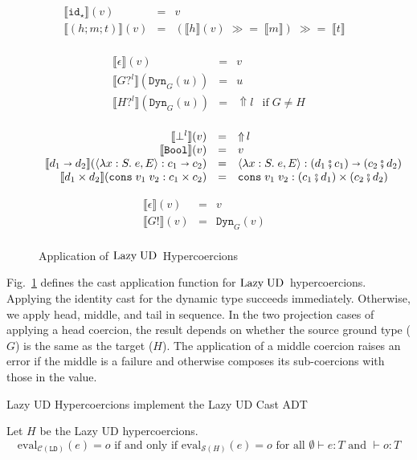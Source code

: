 \documentclass[runningheads]{llncs}
\newcommand{\sidecond}[1]{\text{if}\;#1}
\newcommand{\figequalto}[3]{#1 & = & #2 & #3 \\}
\newcommand{\LUD}{\ensuremath{\text{Lazy\;UD}}}
\newcommand{\CMachine}[1]{\ensuremath{\mathcal{C}(#1)}}
\newcommand{\LDMachine}{\CMachine{\BLD}}
\newcommand{\SMachine}[1]{\ensuremath{\mathcal{S}(#1)}}
\newcommand{\error}[1]{\ensuremath{\mathop{\Uparrow}#1}}
\newcommand{\Tdyn}[0]{\ensuremath{\star}}
\newcommand{\Pbool}[0]{\ensuremath{\mathtt{Bool}}}
\newcommand{\Pfunc}[2]{\ensuremath{#1 \shortrightarrow #2}}
\newcommand{\Pprod}[2]{\ensuremath{#1 \times #2}}
\newcommand{\elam}[3]{\lambda#1:#2.\;#3}
\newcommand{\econs}[2]{\mathtt{cons} \; #1 \; #2}
\newcommand{\ecast}[2]{\ensuremath{#1 : #2}}
\newcommand{\vdyn}[2]{\mathtt{Dyn}_{#1}(#2)}
\newcommand{\vfunc}[4]{\langle\elam{#1}{#2}{#3},#4\rangle}
\newcommand{\vcons}[2]{\econs{#1}{#2}}
\newcommand{\BLD}[0]{\ensuremath{\mathtt{LD}}}
\newcommand{\cnfid}[1]{\ensuremath{\mathtt{id}_{#1}}}
\newcommand{\hcci}[0]{\cnfid{\Tdyn}}
\newcommand{\hccc}[3]{\ensuremath{(#1;#2;#3)}}
\newcommand{\hche}[0]{\ensuremath{\epsilon}}
\newcommand{\hchp}[2]{\ensuremath{#1?^{#2}}}
\newcommand{\hcmbool}[0]{\Pbool}
\newcommand{\hcmfunc}[2]{\Pfunc{#1}{#2}}
\newcommand{\hcmprod}[2]{\Pprod{#1}{#2}}
\newcommand{\hcmfail}[1]{\ensuremath{\bot^l}}
\newcommand{\hcte}[0]{\ensuremath{\epsilon}}
\newcommand{\hcti}[1]{\ensuremath{#1!}}
\newcommand{\mbind}[0]{\ensuremath{\;\gg=\;}}
\newcommand{\denote}[1]{\ensuremath{\llbracket #1 \rrbracket}}
\newcommand{\compose}[2]{\ensuremath{#1 \fatsemi #2}}
\newcommand{\expressiontyping}[3]{\ensuremath{#1 \vdash #2 : #3}}
\newcommand{\valuetyping}[2]{\ensuremath{\vdash #1 : #2}}
\newcommand{\withmachineevalto}[3]{\ensuremath{\mathrm{eval}_{#1}(#2)=#3}}
\newcommand{\machineequiv}[2]{
	\ensuremath{
		\withmachineevalto{#1}{e}{o}	
		\text{ if and only if }
		\withmachineevalto{#2}{e}{o}
		\text{ for all }
		\expressiontyping{\emptyset}{e}{T}
		\text{ and }
		\valuetyping{o}{T}
	}}
\begin{document}
\begin{figure}[tp]
	\fbox{$\denote{c}_c(v)=r$}
	\[
	\begin{array}{rclr}
	\figequalto{\denote{\hcci}(v)}{v}{}
	\figequalto{\denote{\hccc{h}{m}{t}}(v)}{
		(\denote{h}(v) \mbind \denote{m})
		\mbind \denote{t}
	}{}
	\end{array}
	\]
	
	\fbox{$\denote{h}_h(v)=r$}
	\[
	\begin{array}{rclr}
	\figequalto{\denote{\hche}(v)}{v}{}
	\figequalto{\denote{\hchp{G}{l}}(\vdyn{G}{u})}{u}{}
	\figequalto{\denote{\hchp{H}{l}}(\vdyn{G}{u})}{\error{l}}{
		\sidecond{G \neq H}
	}
	\end{array}
	\]
	
	\fbox{$\denote{m}_m(v)=r$}
	\[
	\begin{array}{rclr}
	\figequalto{\denote{\hcmfail{l}}(v)}{\error{l}}{}
	\figequalto{\denote{\hcmbool}(v)}{v}{}
	\figequalto{\denote{\hcmfunc{d_1}{d_2}}(\ecast{\vfunc{x}{S}{e}{E}}{\Pfunc{c_1}{c_2}})}{
		\ecast{\vfunc{x}{S}{e}{E}}{\Pfunc{(\compose{d_1}{c_1})}{(\compose{c_2}{d_2})}}
	}{}
	\figequalto{\denote{\hcmprod{d_1}{d_2}}(\ecast{\vcons{v_1}{v_2}}{\Pprod{c_1}{c_2}})}{
		\ecast{\vcons{v_1}{v_2}}{\Pprod{(\compose{c_1}{d_1})}{(\compose{c_2}{d_2})}}
	}{}
	\end{array}
	\]
	
	\fbox{$\denote{t}_t(v)=r$}
	\[
	\begin{array}{rclr}
	\figequalto{\denote{\hcte}(v)}{v}{}
	\figequalto{\denote{\hcti{G}}(v)}{\vdyn{G}{v}}{}
	\end{array}
	\]
	\caption{Application of \LUD\ Hypercoercions}
	\label{fig:LazyUD-Hypercoercions-application}
\end{figure}

Fig.~\ref{fig:LazyUD-Hypercoercions-application} defines the cast application 
function for \LUD\ hypercoercions.
Applying the identity cast for the dynamic type succeeds immediately. 
Otherwise, we apply head, middle, and tail in sequence. 
%
In the two projection cases of applying a head coercion, the result
depends on whether the source ground type ($G$) is the same as the
target ($H$).
%
The application of a middle coercion raises an error if the middle is
a failure and otherwise composes its sub-coercions with those in the
value.

\begin{proposition} Lazy UD Hypercoercions implement the Lazy UD Cast ADT
\end{proposition}
\begin{theorem} Let $H$ be the Lazy UD 
	hypercoercions.
	\[\machineequiv{\LDMachine}{\SMachine{H}}\]
\end{theorem}
\end{document}
